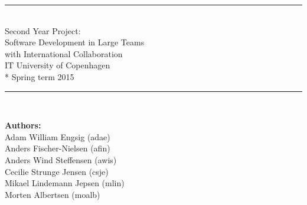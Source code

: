 \begin{titlepage}

\begin{center}


\vspace{67mm}

\rule{\textwidth}{1mm}\\
\vspace*{17mm}
\huge{
Second Year Project: \\ 
Software Development in Large Teams \\
with International Collaboration \\ 
\vspace*{8mm}
IT University of Copenhagen \\*
Spring term 2015
}
\vspace*{7mm}

\rule{\textwidth}{1mm}\\

\vspace*{19mm}


\begin{Large}
\textbf{Authors:} \\
\vspace*{2mm}
Adam William Engsig  (adae)\\
Anders Fischer-Nielsen (afin) \\
Anders Wind Steffensen (awis) \\
Cecilie Strunge Jensen (csje) \\
Mikael Lindemann Jepsen (mlin) \\
Morten Albertsen (moalb)\\
\end{Large}
\end{center}
\end{titlepage}
\newpage